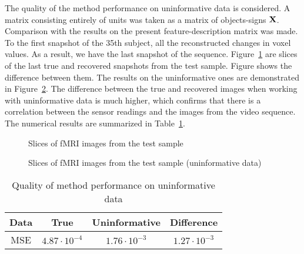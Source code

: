 \documentclass{article}
\begin{document}
The quality of the method performance on uninformative data is considered.
A matrix consisting entirely of units was taken as a matrix of objects-signs $\mathbf{X}$.
Comparison with the results on the present feature-description matrix was made.
To the first snapshot of the 35th subject, all the reconstructed
changes in voxel values.
As a result, we have the last snapshot of the sequence. Figure~\ref{fig:recover}
are slices of the last true and recovered snapshots from the test sample.
Figure shows the difference between them.
The results on the uninformative ones are demonstrated in Figure~\ref{fig:random}.
The difference between the true and recovered images when working with uninformative data
is much higher, which confirms that there is a correlation between the sensor readings and the
images from the video sequence. The numerical results are summarized in Table~\ref{table:random}.

\begin{figure}[h!]
	\centering
	\hfill
	\hfill
	\caption{Slices of fMRI images from the test sample}
	\label{fig:recover}
\end{figure}

\begin{figure}[h!]
	\centering
	\hfill
	\hfill
	\caption{Slices of fMRI images from the test sample (uninformative data)}
	\label{fig:random}
\end{figure}

\begin{table}[h!]
	\centering
	\caption{Quality of method performance on uninformative data}
	\begin{tabular}{|c|c|c|c|}
		\hline
		Data & True          & Uninformative & Difference \\ \hline \hline
		MSE     & $4.87 \cdot 10^{-4}$ & $1.76 \cdot 10^{-3}$ & $1.27 \cdot 10^{-3}$ \\ \hline
	\end{tabular}
	\label{table:random}
\end{table}
\end{document}
